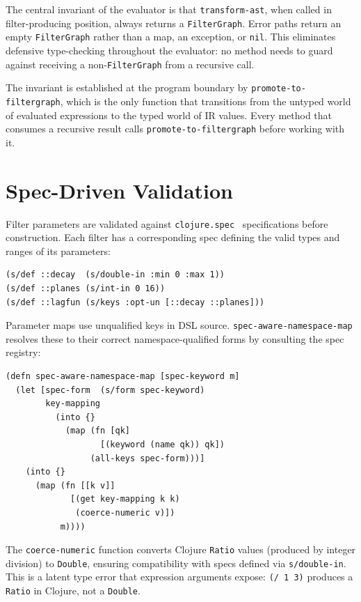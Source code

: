 \documentclass[conference]{IEEEtran}
\begin{document}
The central invariant of the evaluator is that \texttt{transform-ast}, when called in filter-producing position, always returns a \texttt{FilterGraph}. Error paths return an empty \texttt{FilterGraph} rather than a map, an exception, or \texttt{nil}. This eliminates defensive type-checking throughout the evaluator: no method needs to guard against receiving a non-\texttt{FilterGraph} from a recursive call.

The invariant is established at the program boundary by \texttt{promote-to-filtergraph}, which is the only function that transitions from the untyped world of evaluated expressions to the typed world of IR values. Every method that consumes a recursive result calls \texttt{promote-to-filtergraph} before working with it.

\section{Spec-Driven Validation}

Filter parameters are validated against \texttt{clojure.spec}~\cite{clojurespec} specifications before construction. Each filter has a corresponding spec defining the valid types and ranges of its parameters:

\begin{lstlisting}[caption={Example spec for the lagfun filter}]
(s/def ::decay  (s/double-in :min 0 :max 1))
(s/def ::planes (s/int-in 0 16))
(s/def ::lagfun (s/keys :opt-un [::decay ::planes]))
\end{lstlisting}

Parameter maps use unqualified keys in DSL source. \texttt{spec-aware-namespace-map} resolves these to their correct namespace-qualified forms by consulting the spec registry:

\begin{lstlisting}[caption={Namespace resolution via spec introspection}]
(defn spec-aware-namespace-map [spec-keyword m]
  (let [spec-form  (s/form spec-keyword)
        key-mapping
          (into {}
            (map (fn [qk]
                   [(keyword (name qk)) qk])
                 (all-keys spec-form)))]
    (into {}
      (map (fn [[k v]]
             [(get key-mapping k k)
              (coerce-numeric v)])
           m))))
\end{lstlisting}

The \texttt{coerce-numeric} function converts Clojure \texttt{Ratio} values (produced by integer division) to \texttt{Double}, ensuring compatibility with specs defined via \texttt{s/double-in}. This is a latent type error that expression arguments expose: \texttt{(/ 1 3)} produces a \texttt{Ratio} in Clojure, not a \texttt{Double}.
\end{document}
